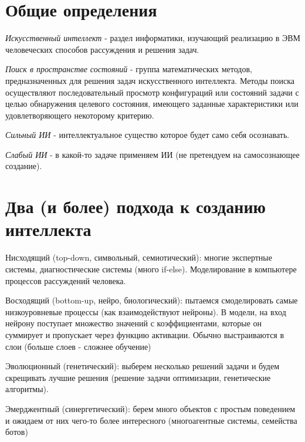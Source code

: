 \documentclass[14pt]{extarticle}
\begin{document}
\tableofcontents\newpage

\section{Общие определения}
\par\textit{Искусственный интеллект} - раздел
информатики, изучающий реализацию в ЭВМ человеческих способов рассуждения и
решения задач.

\par\textit{Поиск в пространстве состояний} - группа математических методов, предназначенных для решения задач
искусственного интеллекта. Методы поиска осуществляют последовательный просмотр
конфигураций или состояний задачи с целью обнаружения целевого состояния,
имеющего заданные характеристики или удовлетворяющего некоторому критерию.

\par\textit{Сильный ИИ} - интеллектуальное существо которое
будет само себя осознавать.

\par\textit{Слабый ИИ} - в какой-то задаче применяем ИИ (не
претендуем на самосознающее создание).

\section{Два (и более) подхода к созданию интеллекта}
\par Нисходящий (top-down, символьный, семиотический): многие экспертные
системы, диагностические системы (много if-else). Моделирование в компьютере
процессов рассуждений человека.
\par Восходящий (bottom-up, нейро, биологический): пытаемся смоделировать самые низкоуровневые процессы
(как взаимодействуют нейроны). В модели, на вход нейрону поступает множество
значений с коэффициентами, которые он суммирует и пропускает через функцию
активации. Обычно выстраиваются в слои (больше слоев - сложнее обучение)
\par Эволюционный (генетический): выберем несколько решений задачи и будем
скрещивать лучшие решения (решение задачи оптимизации, генетические алгоритмы).
\par Эмерджентный (синергетический): берем много объектов с простым поведением и
ожидаем от них чего-то более интересного (многоагентные системы, семейства
ботов)
\end{document}
